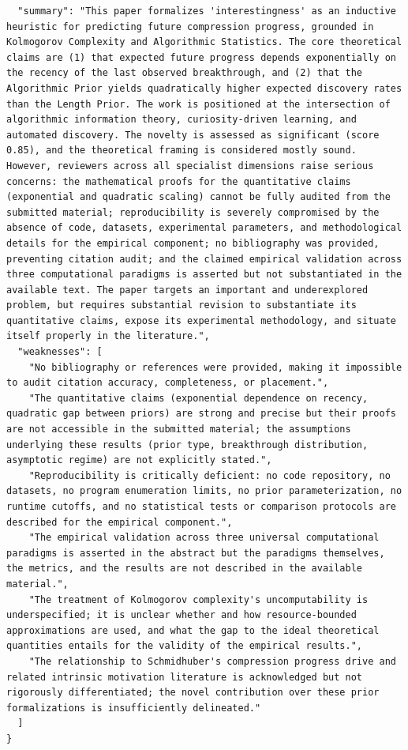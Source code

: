 \documentclass[11pt]{article}
\begin{document}
\begin{verbatim}
  "summary": "This paper formalizes 'interestingness' as an inductive heuristic for predicting future compression progress, grounded in Kolmogorov Complexity and Algorithmic Statistics. The core theoretical claims are (1) that expected future progress depends exponentially on the recency of the last observed breakthrough, and (2) that the Algorithmic Prior yields quadratically higher expected discovery rates than the Length Prior. The work is positioned at the intersection of algorithmic information theory, curiosity-driven learning, and automated discovery. The novelty is assessed as significant (score 0.85), and the theoretical framing is considered mostly sound. However, reviewers across all specialist dimensions raise serious concerns: the mathematical proofs for the quantitative claims (exponential and quadratic scaling) cannot be fully audited from the submitted material; reproducibility is severely compromised by the absence of code, datasets, experimental parameters, and methodological details for the empirical component; no bibliography was provided, preventing citation audit; and the claimed empirical validation across three computational paradigms is asserted but not substantiated in the available text. The paper targets an important and underexplored problem, but requires substantial revision to substantiate its quantitative claims, expose its experimental methodology, and situate itself properly in the literature.",
  "weaknesses": [
    "No bibliography or references were provided, making it impossible to audit citation accuracy, completeness, or placement.",
    "The quantitative claims (exponential dependence on recency, quadratic gap between priors) are strong and precise but their proofs are not accessible in the submitted material; the assumptions underlying these results (prior type, breakthrough distribution, asymptotic regime) are not explicitly stated.",
    "Reproducibility is critically deficient: no code repository, no datasets, no program enumeration limits, no prior parameterization, no runtime cutoffs, and no statistical tests or comparison protocols are described for the empirical component.",
    "The empirical validation across three universal computational paradigms is asserted in the abstract but the paradigms themselves, the metrics, and the results are not described in the available material.",
    "The treatment of Kolmogorov complexity's uncomputability is underspecified; it is unclear whether and how resource-bounded approximations are used, and what the gap to the ideal theoretical quantities entails for the validity of the empirical results.",
    "The relationship to Schmidhuber's compression progress drive and related intrinsic motivation literature is acknowledged but not rigorously differentiated; the novel contribution over these prior formalizations is insufficiently delineated."
  ]
}
\end{verbatim}
\end{document}

